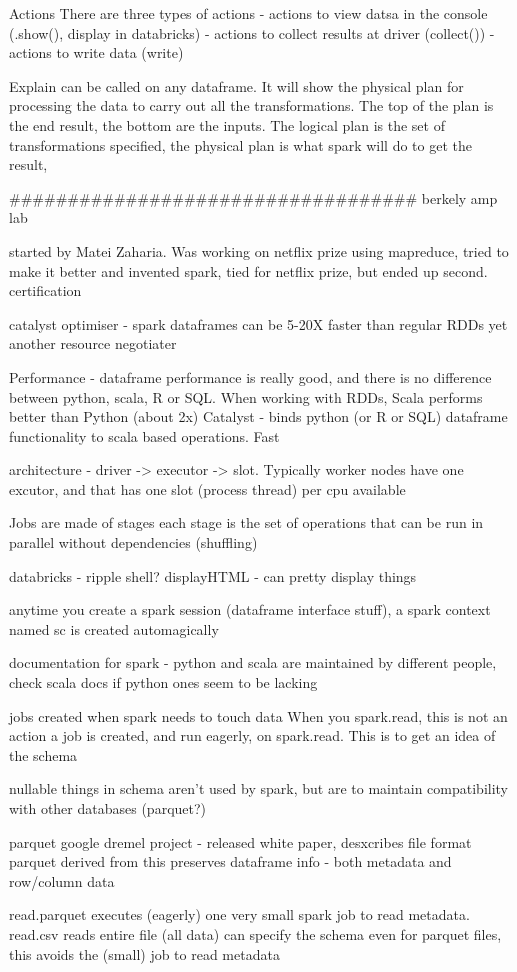 \documentclass{article}
\begin{document}
Actions
There are three types of actions
- actions to view datsa in the console (.show(), display in databricks)
- actions to collect results at driver (collect())
- actions to write data (write)

Explain can be called on any dataframe. It will show the physical plan for processing the data to carry out all the transformations. The top of the plan is the end result, the bottom are the inputs. The logical plan is the set of transformations specified, the physical plan is what spark will do to get the result, 


###################################
berkely amp lab

started by Matei Zaharia. Was working on netflix prize using mapreduce, tried to make it better and invented spark, tied for netflix prize, but ended up second.
certification

catalyst optimiser - spark dataframes can be 5-20X faster than regular RDDs
yet another resource negotiater

Performance - dataframe performance is really good, and there is no difference between python, scala, R or SQL. When working with RDDs, Scala performs better than Python (about 2x)
Catalyst - binds python (or R or SQL) dataframe functionality to scala based operations. Fast

architecture - driver -> executor -> slot. Typically worker nodes have one excutor, and that has one slot (process thread) per cpu available


Jobs are made of stages
each stage is the set of operations that can be run in parallel without dependencies (shuffling)

databricks - ripple shell?
displayHTML - can pretty display things


anytime you create a spark session (dataframe interface stuff), a spark context named sc is created automagically

documentation for spark - python and scala are maintained by different people, check scala docs if python ones seem to be lacking

jobs created when spark needs to touch data
When you spark.read, this is not an action
a job is created, and run eagerly, on spark.read. This is to get an idea of the schema

nullable things in schema aren't used by spark, but are to maintain compatibility with other databases (parquet?)

parquet
google dremel project - released white paper, desxcribes file format
parquet derived from this
preserves dataframe info - both metadata and row/column data

read.parquet executes (eagerly) one very small spark job to read metadata. read.csv reads entire file (all data)
can specify the schema even for parquet files, this avoids the (small) job to read metadata
\end{document}
